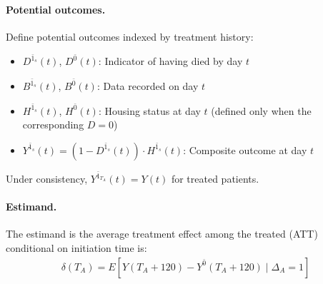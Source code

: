 \paragraph{Potential outcomes.}
Define potential outcomes indexed by treatment history:
\begin{itemize}
    \item $D^{\bar{1}_s}(t)$, $D^{\bar{0}}(t)$: Indicator of having died by day $t$
    \item $B^{\bar{1}_s}(t)$, $B^{\bar{0}}(t)$: Data recorded on day $t$
    \item $H^{\bar{1}_s}(t)$, $H^{\bar{0}}(t)$: Housing status at day $t$ (defined only when the corresponding $D = 0$)
    \item $Y^{\bar{1}_s}(t) = (1 - D^{\bar{1}_s}(t)) \cdot H^{\bar{1}_s}(t)$: Composite outcome at day $t$
\end{itemize}
Under consistency, $Y^{\bar{1}_{T_A}}(t) = Y(t)$ for treated patients.

\paragraph{Estimand.}
The estimand is the average treatment effect among the treated (ATT) conditional on initiation time is:
\begin{align*}
    \delta(T_A) = E\!\left[Y(T_A + 120) - Y^{\bar{0}}(T_A + 120) \mid \Delta_A = 1\right]
\end{align*}


